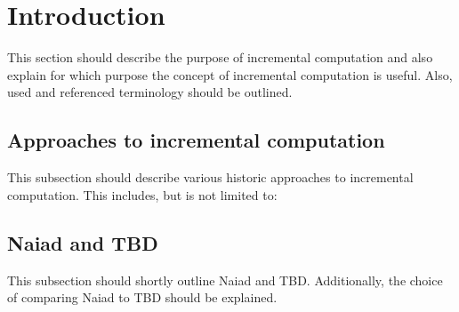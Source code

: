 \section{Introduction}
This section should describe the purpose of incremental computation and also explain for which purpose the concept of incremental computation is useful. Also, used and referenced terminology should be outlined.  

\subsection{Approaches to incremental computation}
This subsection should describe various historic approaches to incremental computation. This includes, but is not limited to: 

\subsection{Naiad and TBD}
This subsection should shortly outline Naiad and TBD. Additionally, the choice of comparing Naiad to TBD should be explained. 

